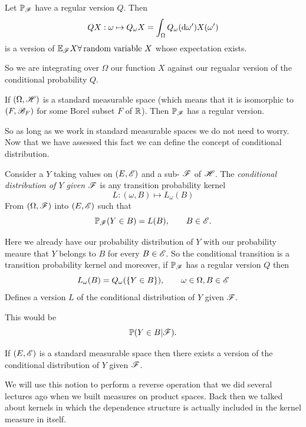 \documentclass{report}
\begin{document}
\begin{proposition}
	Let $\mathbb{P}_{\mathscr{F}}$ have a regular version $Q$. Then
	\begin{equation*}
		QX:\omega\mapsto Q_\omega X=\int_\Omega Q_\omega(\mathop{}\!\mathrm{d}\omega')X(\omega')
	\end{equation*}
	is a version of $\mathbb{E}_{\mathscr{F}} X\forall\, \text{random variable{} }X$ whose expectation exists.
\end{proposition}
So we are integrating over $\Omega$ our function $X$ against our regualar version of the conditional probability $Q$.
\begin{theorem}
	If $(\Omega,\mathscr{H})$ is a standard measurable space (which means that it is isomorphic to $(F,\mathscr{B}_F)$ for some Borel subset $F$ of $\mathbb{R}$). Then $\mathbb{P}_{\mathscr{F}}$ has a regular version.
\end{theorem}
So as long as we work in standard measurable spaces we do not need to worry. Now that we have assessed this fact we can define the concept of conditional distribution.
\begin{definition}
	Consider a \rv{} $Y$ taking values on $(E,\mathscr{E})$ and a sub-\sa{} $\mathscr{F}$ of $\mathscr{H}$. The \emph{conditional distribution of $Y$ given $\mathscr{F}$} is any transition probability kernel
	\begin{equation*}
		L:(\omega,B)\mapsto L_{\omega}(B)
	\end{equation*}
	From $(\Omega,\mathscr{F})$ into $(E,\mathscr{E})$ such that
	\begin{equation*}
		\mathbb{P}_{\mathscr{F}}(Y\in B)=L(B),\qquad B\in\mathscr{E}.
	\end{equation*}
 \end{definition}
 Here we already have our probability distribution of $Y$ with our probability meaure that $Y$ belongs to $B$ for every $B\in\mathscr{E}$. So the conditional transition is a transition probability kernel and moreover, if $\mathbb{P}_{\mathscr{F}}$ has a regular version $Q$ then 
 \begin{equation*}
 	L_\omega (B)=Q_\omega (\{Y\in B\}),\qquad\omega\in\Omega,B\in\mathscr{E}
 \end{equation*}
 Defines a version $L$ of the conditional distribution of $Y$ given $\mathscr{F}.$
 \begin{notation}
 	This would be 
 	\[\mathbb{P}(Y\in B|\mathscr{F}).\]
 \end{notation}
 \begin{theorem}
 	If $(E,\mathscr{E})$ is a standard measurable space then there exists a version of the conditional distribution of $Y$ given $\mathscr{F}$.
 \end{theorem}
 We will use this notion to perform a reverse operation that we did several lectures ago when we built measures on product spaces. Back then we talked about kernels in which the dependence structure is actually included in the kernel measure in itself.
\end{document}
